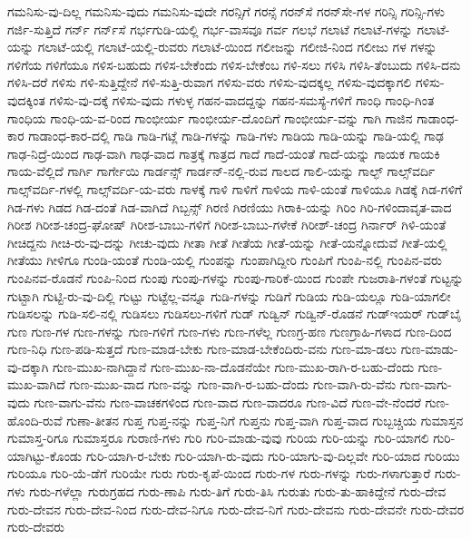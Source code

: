 {ಗಮನಿಸು-ವು-ದಿಲ್ಲ
ಗಮನಿಸು-ವುದು
ಗಮನಿಸು-ವುದೇ
ಗರನ್ಸಿಗೆ
ಗರನ್ಸೆ
ಗರನ್‌ಸೆ
ಗರನ್‌ಸೇ-ಗಳ
ಗರಿನ್ಸಿ
ಗರಿನ್ಸಿ-ಗಳು
ಗರ್ಜಿ-ಸುತ್ತಿದೆ
ಗರ್ನ್
ಗರ್ನ್‌ಸೆ
ಗರ್ಭಗುಡಿ-ಯಲ್ಲಿ
ಗರ್ಭ-ವಾಸವೂ
ಗರ್ವ
ಗಲಭೆ
ಗಲಾಟೆ
ಗಲಾಟೆ-ಗಳನ್ನು
ಗಲಾಟೆ-ಯನ್ನು
ಗಲಾಟೆ-ಯಲ್ಲಿ
ಗಲಾಟೆ-ಯಲ್ಲಿ-ರುವರು
ಗಲಾಟೆ-ಯಿಂದ
ಗಲೀಜನ್ನು
ಗಲೀಜಿ-ನಿಂದ
ಗಲೀಜು
ಗಳ
ಗಳನ್ನು
ಗಳಿಗೆಯ
ಗಳಿಗೆಯೂ
ಗಳಿಸ-ಬಹುದು
ಗಳಿಸ-ಬೇಕೆಂದು
ಗಳಿಸ-ಬೇಕೆಂಬ
ಗಳಿ-ಸಲು
ಗಳಿಸಿ
ಗಳಿಸಿ-ತೆಂಬುದು
ಗಳಿಸಿ-ದನು
ಗಳಿಸಿ-ದರೆ
ಗಳಿಸು
ಗಳಿ-ಸುತ್ತಿದ್ದೇನೆ
ಗಳಿ-ಸುತ್ತಿ-ರುವಾಗ
ಗಳಿಸು-ವರು
ಗಳಿಸು-ವುದಕ್ಕಲ್ಲ
ಗಳಿಸು-ವುದಕ್ಕಾಗಲಿ
ಗಳಿಸು-ವುದಕ್ಕಿಂತ
ಗಳಿಸು-ವು-ದಕ್ಕೆ
ಗಳಿಸು-ವುದು
ಗಳುಳ್ಳ
ಗಹನ-ವಾದದ್ದನ್ನು
ಗಹನ-ಸಮಸ್ಯೆ-ಗಳಿಗೆ
ಗಾಂಧಿ
ಗಾಂಧಿ-ಗಿಂತ
ಗಾಂಧಿಯ
ಗಾಂಧಿ-ಯ-ವ-ರಿಂದ
ಗಾಂಭೀರ್ಯ
ಗಾಂಭೀರ್ಯ-ದೊಂದಿಗೆ
ಗಾಂಭೀರ್ಯ-ವನ್ನು
ಗಾಗಿ
ಗಾಜಿನ
ಗಾಡಾಂಧ-ಕಾರ
ಗಾಡಾಂಧ-ಕಾರ-ದಲ್ಲಿ
ಗಾಡಿ
ಗಾಡಿ-ಗಟ್ಲೆ
ಗಾಡಿ-ಗಳನ್ನು
ಗಾಡಿ-ಗಳು
ಗಾಡಿಯ
ಗಾಡಿ-ಯನ್ನು
ಗಾಡಿ-ಯಲ್ಲಿ
ಗಾಢ
ಗಾಢ-ನಿದ್ರೆ-ಯಿಂದ
ಗಾಢ-ವಾಗಿ
ಗಾಢ-ವಾದ
ಗಾತ್ರಕ್ಕೆ
ಗಾತ್ರದ
ಗಾದೆ
ಗಾದೆ-ಯಂತೆ
ಗಾದೆ-ಯನ್ನು
ಗಾಯಕ
ಗಾಯಕಿ
ಗಾಯ-ವೆಲ್ಲಿದೆ
ಗಾರ್ಗಿ
ಗಾರ್ಗೇಯಿ
ಗಾರ್ಡನ್ಸ್
ಗಾರ್ಡನ್‌-ನಲ್ಲಿ-ರುವ
ಗಾಲದ
ಗಾಲಿ-ಯನ್ನು
ಗಾಲ್ಫ್
ಗಾಲ್ಸ್‌ವರ್ದಿ
ಗಾಲ್ಸ್‌ವರ್ದಿ-ಗಳಲ್ಲಿ
ಗಾಲ್ಸ್‌ವರ್ದಿ-ಯ-ವರು
ಗಾಳಕ್ಕೆ
ಗಾಳಿ
ಗಾಳಿಗೆ
ಗಾಳಿಯ
ಗಾಳಿ-ಯಂತೆ
ಗಾಳಿಯೂ
ಗಿಡಕ್ಕೆ
ಗಿಡ-ಗಳಿಗೆ
ಗಿಡ-ಗಳು
ಗಿಡದ
ಗಿಡ-ದಂತೆ
ಗಿಡ-ವಾಗಿದೆ
ಗಿಬ್ಬನ್ಸ್
ಗಿರಣಿ
ಗಿರಣಿಯು
ಗಿರಾಕಿ-ಯನ್ನು
ಗಿರಿಂ
ಗಿರಿ-ಗಳಿಂದಾವೃತ-ವಾದ
ಗಿರೀಶ
ಗಿರೀಶ-ಚಂದ್ರ-ಘೋಷ್
ಗಿರೀಶ-ಬಾಬು-ಗಳಿಗೆ
ಗಿರೀಶ-ಬಾಬು-ಗಳೇಕೆ
ಗಿರೀಶ್‌-ಚಂದ್ರ
ಗಿರ್ನಾರ್‌
ಗಿಳಿ-ಯಂತೆ
ಗೀಚಿದ್ದನು
ಗೀಚಿ-ರು-ವು-ದನ್ನು
ಗೀಚು-ವುದು
ಗೀತಾ
ಗೀತೆ
ಗೀತೆಯ
ಗೀತೆ-ಯನ್ನು
ಗೀತೆ-ಯನ್ನೋದುವೆ
ಗೀತೆ-ಯಲ್ಲಿ
ಗೀತೆಯು
ಗೀಳಿಗೂ
ಗುಂಡಿ-ಯಂತೆ
ಗುಂಡಿ-ಯಲ್ಲಿ
ಗುಂಪನ್ನು
ಗುಂಪಾಗಿದ್ದೀರಿ
ಗುಂಪಿಗೆ
ಗುಂಪಿ-ನಲ್ಲಿ
ಗುಂಪಿನ-ವರು
ಗುಂಪಿನವ-ರೊಡನೆ
ಗುಂಪಿ-ನಿಂದ
ಗುಂಪು
ಗುಂಪು-ಗಳನ್ನು
ಗುಂಪು-ಗಾರಿಕೆ-ಯಿಂದ
ಗುಂಪೇ
ಗುಜರಾತಿ-ಗಳಂತೆ
ಗುಟ್ಟನ್ನು
ಗುಟ್ಟಾಗಿ
ಗುಟ್ಟಿ-ರು-ವು-ದಿಲ್ಲಿ
ಗುಟ್ಟು
ಗುಟ್ಟೆಲ್ಲ-ವನ್ನೂ
ಗುಡಿ-ಗಳನ್ನು
ಗುಡಿಗೆ
ಗುಡಿಯ
ಗುಡಿ-ಯಲ್ಲೂ
ಗುಡಿ-ಯಾಗಲೀ
ಗುಡಿಸಲನ್ನು
ಗುಡಿ-ಸಲಿ-ನಲ್ಲಿ
ಗುಡಿಸಲು
ಗುಡಿಸಲು-ಗಳಿಗೆ
ಗುಡ್
ಗುಡ್ವಿನ್
ಗುಡ್ವಿನ್‌-ರೊಡನೆ
ಗುಡ್‌ಇಯರ್
ಗುಡ್‌ಬೈ
ಗುಣ
ಗುಣ-ಗಳ
ಗುಣ-ಗಳನ್ನು
ಗುಣ-ಗಳಿಗೆ
ಗುಣ-ಗಳು
ಗುಣ-ಗಳೆಲ್ಲ
ಗುಣಗ್ರ-ಹಣ
ಗುಣಗ್ರಾಹಿ-ಗಳಾದ
ಗುಣ-ದಿಂದ
ಗುಣ-ನಿಧಿ
ಗುಣ-ಪಡಿ-ಸುತ್ತದೆ
ಗುಣ-ಮಾಡ-ಬೇಕು
ಗುಣ-ಮಾಡ-ಬೇಕೆಂದಿರು-ವನು
ಗುಣ-ಮಾ-ಡಲು
ಗುಣ-ಮಾಡು-ವು-ದಕ್ಕಾಗಿ
ಗುಣ-ಮುಖ-ನಾಗಿದ್ದಾನೆ
ಗುಣ-ಮುಖ-ನಾ-ದೊಡನೆಯೇ
ಗುಣ-ಮುಖ-ರಾಗಿ-ರ-ಬಹು-ದೆಂದು
ಗುಣ-ಮುಖ-ವಾಗಿದೆ
ಗುಣ-ಮುಖ-ವಾದ
ಗುಣ-ವನ್ನು
ಗುಣ-ವಾಗಿ-ರ-ಬಹು-ದೆಂದು
ಗುಣ-ವಾಗಿ-ರು-ವೆನು
ಗುಣ-ವಾಗು-ವುದು
ಗುಣ-ವಾಗು-ವೆನು
ಗುಣ-ವಾಚಕಗಳಿಂದ
ಗುಣ-ವಾದ
ಗುಣ-ವಾದರೂ
ಗುಣ-ವಿದೆ
ಗುಣ-ವೇ-ನೆಂದರೆ
ಗುಣ-ಹೊಂದಿ-ರುವೆ
ಗುಣಾ-ತೀತನ
ಗುಪ್ತ
ಗುಪ್ತ-ನನ್ನು
ಗುಪ್ತ-ನಿಗೆ
ಗುಪ್ತನು
ಗುಪ್ತ-ವಾಗಿ
ಗುಪ್ತ-ವಾದ
ಗುಬ್ಬಚ್ಚಿಯ
ಗುಮಾಸ್ತನ
ಗುಮಾಸ್ತ-ರಿಗೂ
ಗುಮಾಸ್ತರೂ
ಗುರಾಣಿ-ಗಳು
ಗುರಿ
ಗುರಿ-ಮಾಡು-ವುವು
ಗುರಿಯ
ಗುರಿ-ಯನ್ನು
ಗುರಿ-ಯಾಗಲಿ
ಗುರಿ-ಯಾಗಿಟ್ಟು-ಕೊಂಡು
ಗುರಿ-ಯಾಗಿ-ರ-ಬೇಕು
ಗುರಿ-ಯಾಗಿ-ರು-ವುದು
ಗುರಿ-ಯಾಗು-ವು-ದಿಲ್ಲವೇ
ಗುರಿ-ಯಾದ
ಗುರಿಯು
ಗುರಿಯೂ
ಗುರಿ-ಯೆ-ಡೆಗೆ
ಗುರಿಯೇ
ಗುರು
ಗುರು-ಕೃಪೆ-ಯಿಂದ
ಗುರು-ಗಳ
ಗುರು-ಗಳನ್ನು
ಗುರು-ಗಳಾಗುತ್ತಾರೆ
ಗುರು-ಗಳು
ಗುರು-ಗಳೆಲ್ಲಾ
ಗುರುಗ್ರಹದ
ಗುರು-ಣಾಪಿ
ಗುರು-ತಿಗೆ
ಗುರು-ತಿಸಿ
ಗುರುತು
ಗುರು-ತು-ಹಾಕಿದ್ದೇನೆ
ಗುರು-ದೇವ
ಗುರು-ದೇವನ
ಗುರು-ದೇವ-ನಿಂದ
ಗುರು-ದೇವ-ನಿಗೂ
ಗುರು-ದೇವ-ನಿಗೆ
ಗುರು-ದೇವನು
ಗುರು-ದೇವನೇ
ಗುರು-ದೇವರ
ಗುರು-ದೇವರು
}
